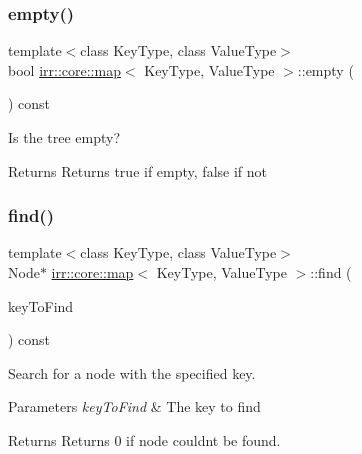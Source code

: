 \subsubsection{\texorpdfstring{empty()}{empty()}\hspace{0.1cm}{\footnotesize\ttfamily [2/2]}}
{\footnotesize\ttfamily template$<$class Key\+Type, class Value\+Type$>$ \\
bool \hyperlink{classirr_1_1core_1_1map}{irr\+::core\+::map}$<$ Key\+Type, Value\+Type $>$\+::empty (\begin{DoxyParamCaption}{ }\end{DoxyParamCaption}) const\hspace{0.3cm}{\ttfamily [inline]}}



Is the tree empty? 

\begin{DoxyReturn}{Returns}
Returns true if empty, false if not 
\end{DoxyReturn}
\mbox{\label{classirr_1_1core_1_1map_ad6a62579dceda1da7605ee78bca3e318}} 
\subsubsection{\texorpdfstring{find()}{find()}\hspace{0.1cm}{\footnotesize\ttfamily [1/2]}}
{\footnotesize\ttfamily template$<$class Key\+Type, class Value\+Type$>$ \\
Node$\ast$ \hyperlink{classirr_1_1core_1_1map}{irr\+::core\+::map}$<$ Key\+Type, Value\+Type $>$\+::find (\begin{DoxyParamCaption}\item[{const Key\+Type \&}]{key\+To\+Find }\end{DoxyParamCaption}) const\hspace{0.3cm}{\ttfamily [inline]}}



Search for a node with the specified key. 


\begin{DoxyParams}{Parameters}
{\em key\+To\+Find} & The key to find \\
\hline
\end{DoxyParams}
\begin{DoxyReturn}{Returns}
Returns 0 if node couldn\textquotesingle{}t be found. 
\end{DoxyReturn}
\mbox{\label{classirr_1_1core_1_1map_ad6a62579dceda1da7605ee78bca3e318}} 
